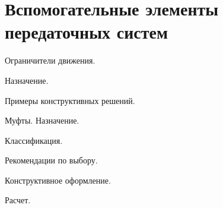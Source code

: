 \chapter{Вспомогательные элементы передаточных систем}

Ограничители движения. 

Назначение. 

Примеры конструктивных решений.

Муфты.
Назначение. 

Классификация. 

Рекомендации по выбору. 

Конструктивное оформление. 

Расчет.
